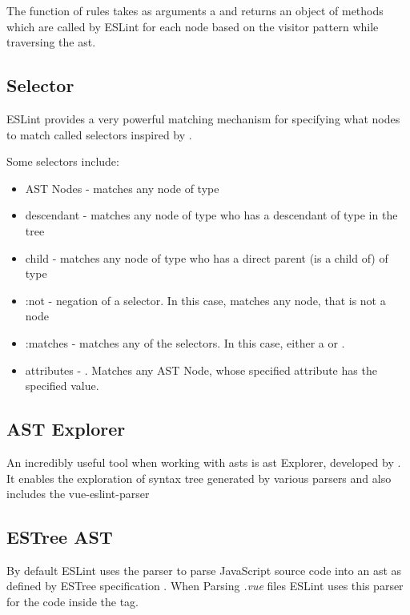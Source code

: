 The  function of rules takes as arguments a  and returns an object of methods which are called by ESLint for each node based on the \gls{visitor} pattern while traversing the \gls{ast}. 

\subsection{Selector}
ESLint provides a very powerful matching mechanism for specifying what nodes to match called selectors \parencite{eslintSelectors} inspired by \textcite{estoolsEsQuery}.

Some selectors include:
\begin{itemize}
  \item AST Nodes -  matches any node of type 
  \item descendant -   matches any node of type  who has a descendant of type  in the tree
  \item child -  matches any node of type  who has a direct parent (is a child of) of type 
  \item :not - negation of a selector. In this case, matches any node, that is not a  node
  \item :matches -  matches any of the selectors. In this case, either a  or .
  \item attributes - . Matches any AST Node, whose specified attribute has the specified value.
\end{itemize}

\subsection{AST Explorer}
An incredibly useful tool when working with \glspl{ast} is \gls{ast} Explorer, developed by \textcite{astexplorer_fkling2021Jan}. It enables the exploration of syntax tree generated by various parsers and also includes the vue-eslint-parser \parencite{eslint_vue_parser}

\subsection{ESTree AST}
By default ESLint uses the \parencite{eslintEspree} parser to parse JavaScript source code into an \gls{ast} as defined by ESTree specification \parencite{estreeASTSpec}. When Parsing \textit{.vue} files ESLint uses this parser for the code inside the  tag.
  

